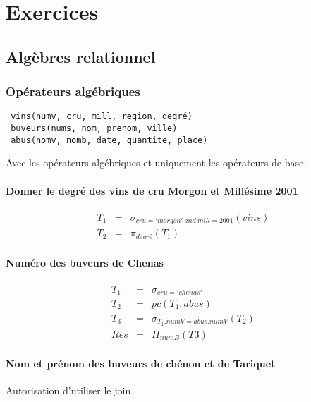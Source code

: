 \chapter{Exercices}
\section{Algèbres relationnel}
\subsection{Opérateurs algébriques}
\texttt{ vins(numv, cru, mill, region, degré) } \\
\texttt{ buveurs(nums, nom, prenom, ville) } \\	
\texttt{ abus(nomv, nomb, date, quantite, place) } \\

	
\begin{attention}
Avec les opérateurs algébriques et uniquement les opérateurs de base. 
\end{attention}

\subsubsection{ Donner le degré des vins de cru Morgon et Millésime 2001 }
\begin{eqnarray*}
	T_1 &=& \sigma_{cru='morgon'~and~mill=2001}(vins)\\
	T_2 &=& \pi_{degré}(T_1)
\end{eqnarray*}
\subsubsection{Numéro des buveurs de Chenas}
\begin{eqnarray*}
	T_1 &=& \sigma_{cru='chenas'}\\
	T_2 &=&  pc(T_1, abus)\\
	T_3 &=& \sigma_{T_1.numV = abus.numV}(T_2)\\
	Res &=& \Pi_{numB}(T3)
\end{eqnarray*}

\subsubsection{Nom et prénom des buveurs de chénon et de Tariquet}
\begin{remarque}{Autorisation d'utiliser le join\\~}\end{remarque}

